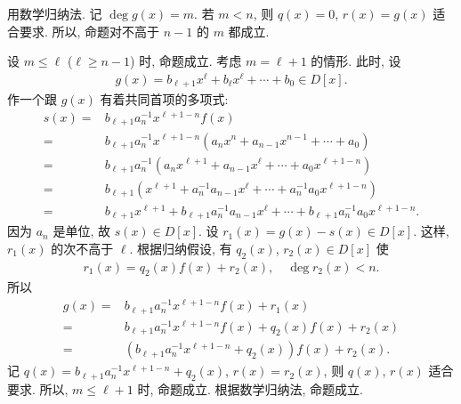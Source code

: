 \begin{pf}
    用数学归纳法. 记 $\deg g(x) = m$. 若 $m<n$, 则 $q(x) = 0$, $r(x) = g(x)$ 适合要求. 所以, 命题对不高于 $n-1$ 的 $m$ 都成立.

    设 $m \leq \ell$ ($\ell \geq n-1$) 时, 命题成立. 考虑 $m=\ell+1$ 的情形. 此时, 设
    \begin{align*}
        g(x) = b_{\ell + 1} x^{\ell} + b_{\ell} x^{\ell} + \cdots + b_0 \in D[x].
    \end{align*}
    作一个跟 $g(x)$ 有着共同首项的多项式:
    \begin{align*}
        s(x) = {} & b_{\ell + 1} a_n^{-1} x^{\ell + 1 - n} f(x)                                                                               \\
        = {}      & b_{\ell + 1} a_n^{-1} x^{\ell + 1 - n} (a_n x^n + a_{n-1} x^{n-1} + \cdots + a_0)                                         \\
        = {}      & b_{\ell + 1} a_n^{-1} (a_n x^{\ell + 1} + a_{n-1} x^{\ell} + \cdots + a_0 x^{\ell + 1 - n})                               \\
        = {}      & b_{\ell + 1} (x^{\ell + 1} + a_n^{-1} a_{n-1} x^{\ell} + \cdots + a_n^{-1} a_0 x^{\ell + 1 - n})                          \\
        = {}      & b_{\ell + 1} x^{\ell + 1} + b_{\ell + 1} a_n^{-1} a_{n-1} x^{\ell} + \cdots + b_{\ell + 1} a_n^{-1} a_0 x^{\ell + 1 - n}.
    \end{align*}
    因为 $a_n$ 是单位, 故 $s(x) \in D[x]$. 设 $r_1 (x) = g(x) - s(x) \in D[x]$. 这样, $r_1 (x)$ 的次不高于 $\ell$. 根据归纳假设, 有 $q_2 (x)$, $r_2(x) \in D[x]$ 使
    \begin{align*}
        r_1 (x) = q_2 (x) f(x) + r_2 (x), \quad \deg r_2 (x) < n.
    \end{align*}
    所以
    \begin{align*}
        g(x)
        = {} & b_{\ell+1} a_n^{-1} x^{\ell+1-n} f(x) + r_1 (x)                \\
        = {} & b_{\ell+1} a_n^{-1} x^{\ell+1-n} f(x) + q_2 (x) f(x) + r_2 (x) \\
        = {} & (b_{\ell+1} a_n^{-1} x^{\ell+1-n} + q_2 (x)) f(x) + r_2 (x).
    \end{align*}
    记 $q(x) = b_{\ell+1} a_n^{-1} x^{\ell+1-n} + q_2 (x)$, $r(x) = r_2 (x)$, 则 $q(x)$, $r(x)$ 适合要求. 所以, $m \leq \ell + 1$ 时, 命题成立. 根据数学归纳法, 命题成立.
\end{pf}

